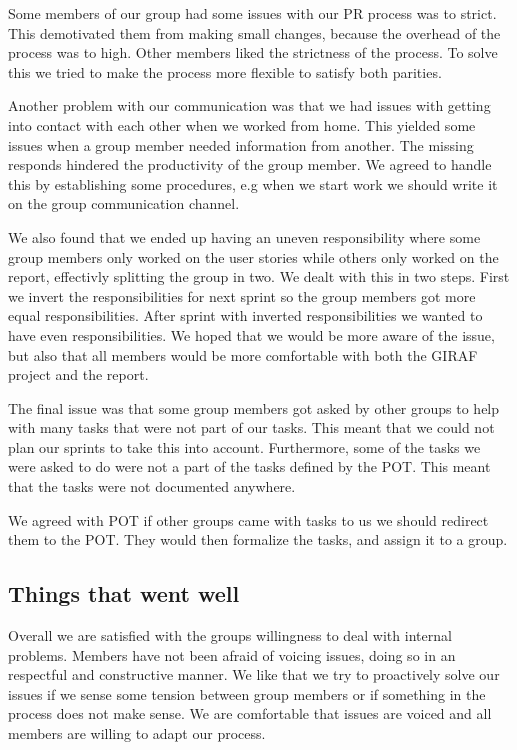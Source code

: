Some members of our group had some issues with our \gls{PR} process was to strict. This demotivated them from making small changes, because the overhead of the process was to high. Other members liked the strictness of the process. To solve this we tried to make the process more flexible to satisfy both parities.

Another problem with our communication was that we had issues with getting into contact with each other when we worked from home. This yielded some issues when a group member needed information from another. The missing responds hindered the productivity of the group member. We agreed to handle this by establishing some procedures, e.g when we start work we should write it on the group communication channel.

We also found that we ended up having an uneven responsibility where some group members only worked on the user stories while others only worked on the report, effectivly splitting the group in two. We dealt with this in two steps. First we invert the responsibilities for next sprint so the group members got more equal responsibilities. After sprint with inverted responsibilities we wanted to have even responsibilities. We hoped that we would be more aware of the issue, but also that all members would be more comfortable with both the GIRAF project and the report.

The final issue was that some group members got asked by other groups to help with many tasks that were not part of our tasks. This meant that we could not plan our sprints to take this into account. Furthermore, some of the tasks we were asked to do were not a part of the tasks defined by the \gls{POT}. This meant that the tasks were not documented anywhere.

We agreed with \gls{POT} if other groups came with tasks to us we should redirect them to the \gls{POT}. They would then formalize the tasks, and assign it to a group.

\subsection{Things that went well}

Overall we are satisfied with the groups willingness to deal with internal problems. Members have not been afraid of voicing issues, doing so in an respectful and constructive manner. We like that we try to proactively solve our issues if we sense some tension between group members or if something in the process does not make sense. We are comfortable that issues are voiced and all members are willing to adapt our process. 